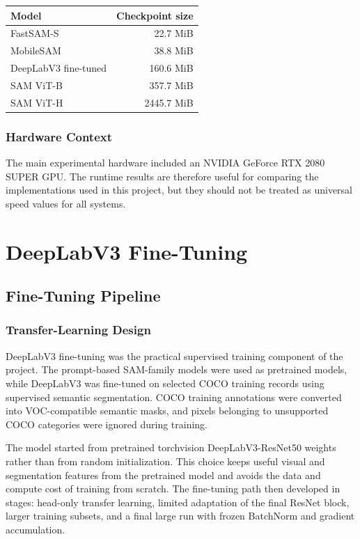 \documentclass[9pt,a4paper,oneside]{rho-class/rho}
\begin{document}
\begin{center}
    \footnotesize
    \setlength{\tabcolsep}{8pt}
    \renewcommand{\arraystretch}{0.95}
    \begin{tabular}{lr}
        \toprule
        \textbf{Model} & \textbf{Checkpoint size} \\
        \midrule
        FastSAM-S & 22.7 MiB \\
        MobileSAM & 38.8 MiB \\
        DeepLabV3 fine-tuned & 160.6 MiB \\
        SAM ViT-B & 357.7 MiB \\
        SAM ViT-H & 2445.7 MiB \\
        \bottomrule
    \end{tabular}
\end{center}

\subsubsection{Hardware Context}

    The main experimental hardware included an NVIDIA GeForce RTX 2080 SUPER GPU. The runtime results are therefore useful for comparing the implementations used in this project, but they should not be treated as universal speed values for all systems.


\section{DeepLabV3 Fine-Tuning}

\subsection{Fine-Tuning Pipeline}

\subsubsection{Transfer-Learning Design}

    DeepLabV3 fine-tuning was the practical supervised training component of the project. The prompt-based SAM-family models were used as pretrained models, while DeepLabV3 was fine-tuned on selected COCO training records using supervised semantic segmentation. COCO training annotations were converted into VOC-compatible semantic masks, and pixels belonging to unsupported COCO categories were ignored during training.

    The model started from pretrained torchvision DeepLabV3-ResNet50 weights rather than from random initialization. This choice keeps useful visual and segmentation features from the pretrained model and avoids the data and compute cost of training from scratch. The fine-tuning path then developed in stages: head-only transfer learning, limited adaptation of the final ResNet block, larger training subsets, and a final large run with frozen BatchNorm and gradient accumulation.
\end{document}
